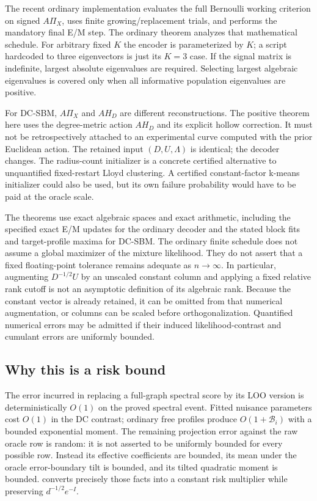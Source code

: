 The recent ordinary implementation evaluates the full Bernoulli working
criterion on signed $A\Pi_X$, uses finite growing/replacement trials, and
performs the mandatory final E/M step. The ordinary theorem analyzes that
mathematical schedule. For arbitrary fixed $K$ the encoder is parameterized
by $K$; a script hardcoded to three eigenvectors is just its $K=3$ case.
If the signal matrix is indefinite, largest absolute eigenvalues are
required. Selecting largest algebraic eigenvalues is covered only when
all informative population eigenvalues are positive.

For DC-SBM, $A\Pi_X$ and $AH_D$ are different reconstructions.
The positive theorem here uses the degree-metric action
$AH_D$ and its explicit hollow correction. It must not be retrospectively
attached to an experimental curve computed with the prior Euclidean
action. The retained input $(D,U,\Lambda)$ is identical; the decoder
changes. The radius-count initializer is a concrete certified alternative
to unquantified fixed-restart Lloyd clustering. A certified constant-factor
k-means initializer could also be used, but its own failure probability
would have to be paid at the oracle scale.

The theorems use exact algebraic spaces and exact arithmetic, including
the specified exact E/M updates for the ordinary decoder and the stated
block fits and target-profile maxima for DC-SBM. The ordinary finite
schedule does not assume a global maximizer of the mixture likelihood.
They do not assert that a fixed floating-point tolerance remains adequate
as $n\to\infty$. In particular, augmenting $D^{-1/2}U$ by an unscaled
constant column and applying a fixed relative rank cutoff is not an
asymptotic definition of its algebraic rank. Because the constant vector is
already retained, it can be omitted from that numerical augmentation, or
columns can be scaled before orthogonalization. Quantified numerical
errors may be admitted if their induced likelihood-contrast and
cumulant errors are uniformly bounded.

\subsection{Why this is a risk bound}

The error incurred in replacing a full-graph spectral score by its LOO
version is deterministically $O(1)$ on the proved spectral event.
Fitted nuisance parameters cost $O(1)$ in the DC contrast; ordinary free
profiles produce $O(1+\mathcal B_i)$ with a bounded exponential moment.
The remaining projection error against the raw oracle row is random:
it is not asserted to be uniformly bounded for every possible row.
Instead its effective coefficients are bounded, its mean under the
oracle error-boundary tilt is bounded, and its tilted quadratic moment
is bounded.  converts precisely those facts into a
constant risk multiplier while preserving $d^{-1/2}e^{-I}$.

